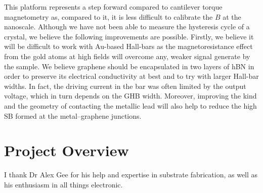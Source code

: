 This platform represents a step forward compared to cantilever torque magnetometry as, compared to it, it is less difficult to calibrate the $B$ at the nanoscale. Although we have not been able to measure the hysteresis cycle of a  crystal, we believe the following improvements are possible. Firstly, we believe it will be difficult to work with Au-based Hall-bars as the magnetoresistance effect from the gold atoms at high fields will overcome any, weaker signal generate by the sample. We believe graphene should be encapsulated in two layers of \gls{hBN} in order to preserve its electrical conductivity at best and to try with larger Hall-bar widths. In fact, the driving current in the bar was often limited by the output voltage, which in turn depends on the \gls{GHB} width. Moreover, improving the kind and the geometry of contacting the metallic lead will also help to reduce the high \gls{SB} formed at the metal--graphene junctions.

\section{Project Overview}
I thank Dr Alex Gee for his help and expertise in substrate fabrication, as well as his enthusiasm in all things electronic.